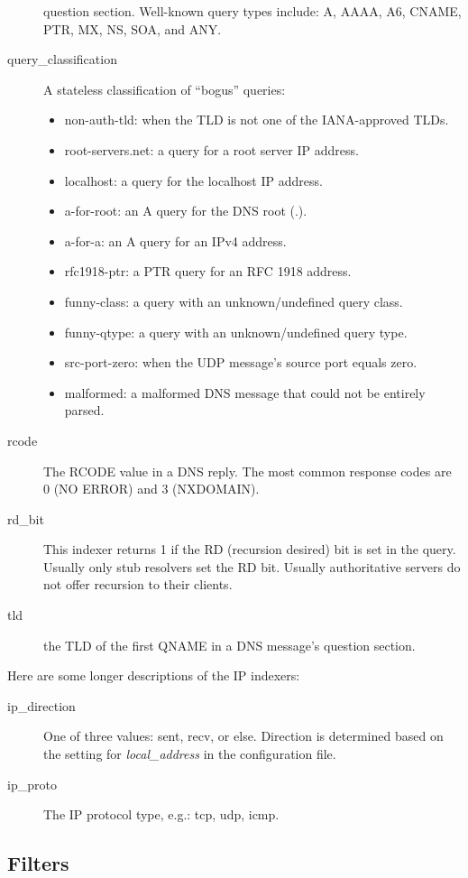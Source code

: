 \documentclass{report}
\begin{document}
\begin{description}
	question section.  Well-known query types include: A, AAAA,
	A6, CNAME, PTR, MX, NS, SOA, and ANY.
\item[query\_classification]
	A stateless classification of ``bogus'' queries:
	\begin{itemize}
	\item non-auth-tld: when the TLD is not one of the IANA-approved TLDs.
	\item root-servers.net: a query for a root server IP address.
	\item localhost: a query for the localhost IP address.
	\item a-for-root: an A query for the DNS root (.).
	\item a-for-a: an A query for an IPv4 address.
	\item rfc1918-ptr: a PTR query for an RFC 1918 address.
	\item funny-class: a query with an unknown/undefined query class.
	\item funny-qtype: a query with an unknown/undefined query type.
	\item src-port-zero: when the UDP message's source port equals zero.
	\item malformed: a malformed DNS message that could not be entirely parsed.
	\end{itemize}
\item[rcode]
	The RCODE value in a DNS reply.  The most common response
	codes are 0 (NO ERROR) and 3 (NXDOMAIN). 
\item[rd\_bit]
	This indexer returns 1 if the RD (recursion desired) bit is
	set in the query.  Usually only stub resolvers set the RD bit.
	Usually authoritative servers do not offer recursion to their
	clients.
\item[tld]
	the TLD of the first QNAME in a DNS message's question section.
\end{description}

\noindent
Here are some longer descriptions of the IP indexers:

\begin{description}
\item[ip\_direction]
	One of three values: sent, recv, or else.  Direction is determined
	based on the setting for {\em local\_address\/} in the configuration file.
\item[ip\_proto]
	The IP protocol type, e.g.: tcp, udp, icmp.
\end{description}

\subsection{Filters}
\end{document}
